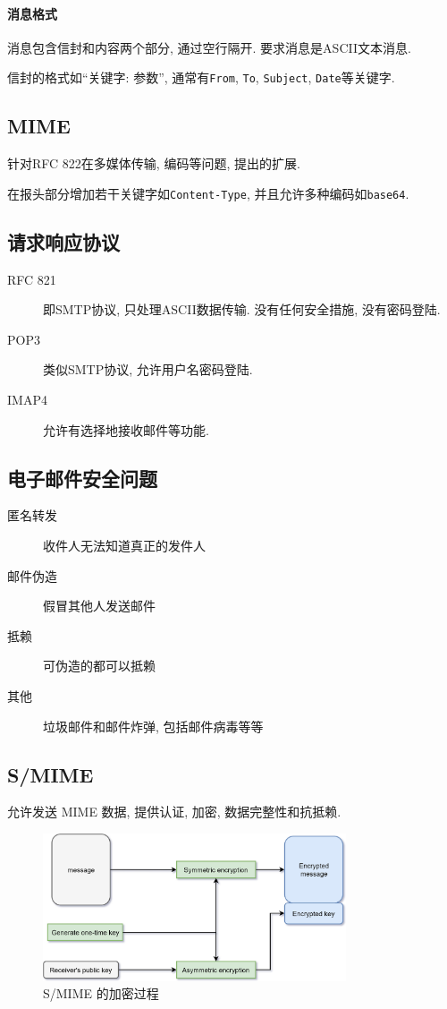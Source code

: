 \documentclass{ctexart}
\begin{document}
\paragraph{消息格式} 消息包含信封和内容两个部分, 通过空行隔开. 要求消息是ASCII文本消息.\par
    信封的格式如``关键字: 参数'', 通常有\verb/From/, \verb/To/, \verb/Subject/, \verb/Date/等关键字.
\subsection{MIME}
    针对RFC 822在多媒体传输, 编码等问题, 提出的扩展.\par
    在报头部分增加若干关键字如\verb/Content-Type/, 并且允许多种编码如\verb/base64/.
\subsection{请求响应协议} \begin{description}
        \item[RFC 821] 即SMTP协议, 只处理ASCII数据传输. 没有任何安全措施, 没有密码登陆.
        \item[POP3] 类似SMTP协议, 允许用户名密码登陆.
        \item[IMAP4] 允许有选择地接收邮件等功能.
    \end{description}
\subsection{电子邮件安全问题}
    \begin{description}
        \item[匿名转发] 收件人无法知道真正的发件人
        \item[邮件伪造] 假冒其他人发送邮件
        \item[抵赖] 可伪造的都可以抵赖
        \item[其他] 垃圾邮件和邮件炸弹, 包括邮件病毒等等
    \end{description}
\subsection{S/MIME}
    允许发送 MIME 数据, 提供认证, 加密, 数据完整性和抗抵赖.

    \begin{figure}[ht!]
    \centering
    \includegraphics[width=0.8\textwidth]{s-mime-enc.jpg}
    \caption{S/MIME 的加密过程}
    \label{s-mime-enc}
    \end{figure}
\end{document}
